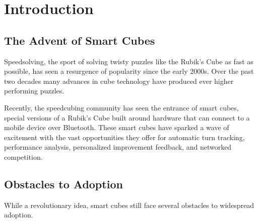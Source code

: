 
\chapter{Introduction} %

\label{Chapter1} %



\section{The Advent of Smart Cubes}

Speedsolving, the sport of solving twisty puzzles like the Rubik’s Cube
as fast as possible, has seen a resurgence of popularity since the
early 2000s. \cite{TODO} Over the past two decades many advances in
cube technology have produced ever higher performing puzzles.

Recently, the speedcubing community has seen the entrance of smart
cubes, special versions of a Rubik’s Cube built around hardware that
can connect to a mobile device over Bluetooth. These smart cubes have
sparked a wave of excitement with the vast opportunities they offer for
automatic turn tracking, performance analysis, personalized improvement
feedback, and networked competition.

\section{Obstacles to Adoption}

While a revolutionary idea, smart cubes still face several obstacles to
widespread adoption.

